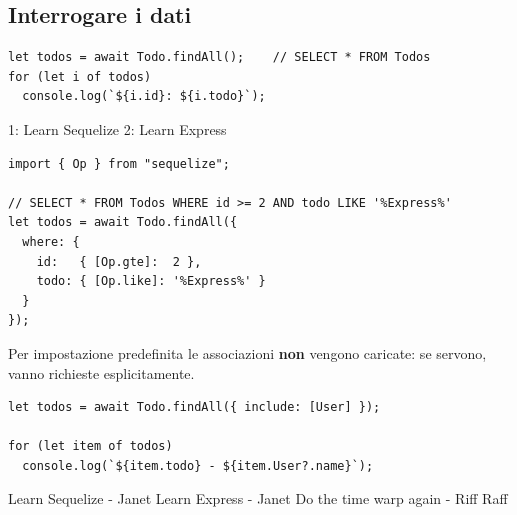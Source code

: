 \subsection{Interrogare i dati}

\begin{affianco}[0.55][c]
\begin{lstlisting}[style=js, name=query.js]
let todos = await Todo.findAll();    // SELECT * FROM Todos
for (let i of todos)
  console.log(`${i.id}: ${i.todo}`);
\end{lstlisting}
\risultato
\begin{console}
1: Learn Sequelize
2: Learn Express
\end{console}
\end{affianco}

\begin{affianco}[0.55][c]
\begin{lstlisting}[style=js, name=query.js]
import { Op } from "sequelize";

// SELECT * FROM Todos WHERE id >= 2 AND todo LIKE '%Express%'
let todos = await Todo.findAll({
  where: {
    id:   { [Op.gte]:  2 },
    todo: { [Op.like]: '%Express%' }
  }
});
\end{lstlisting}
\risultato
\begin{immagine}
\end{immagine}
\end{affianco}

Per impostazione predefinita le associazioni \textbf{non} vengono caricate: se
servono, vanno richieste esplicitamente.

\begin{affianco}[0.55][c]
\begin{lstlisting}[style=js]
let todos = await Todo.findAll({ include: [User] });

for (let item of todos)
  console.log(`${item.todo} - ${item.User?.name}`);
\end{lstlisting}
\risultato
\begin{console}
Learn Sequelize - Janet
Learn Express - Janet
Do the time warp again - Riff Raff
\end{console}
\end{affianco}


